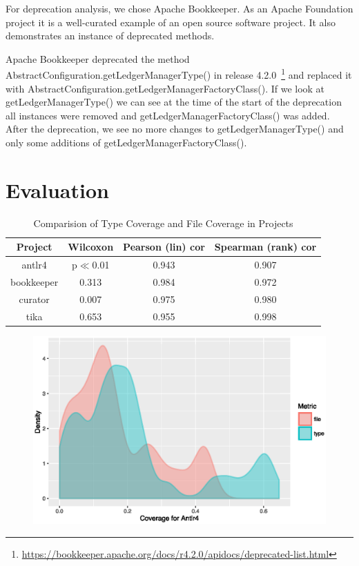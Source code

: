 \documentclass[conference]{IEEEtran}
\begin{document}
For deprecation analysis, we chose Apache Bookkeeper. As an Apache Foundation project it is a well-curated example of an open source software project. It also demonstrates an instance of deprecated methods. 

Apache Bookkeeper deprecated the method AbstractConfiguration.getLedgerManagerType() in release 4.2.0~\footnote{\url{https://bookkeeper.apache.org/docs/r4.2.0/apidocs/deprecated-list.html}} and replaced it with AbstractConfiguration.getLedgerManagerFactoryClass(). If we look at getLedgerManagerType() we can see at the time of the start of the deprecation all instances were removed and getLedgerManagerFactoryClass() was added. After the deprecation, we see no more changes to getLedgerManagerType() and only some additions of getLedgerManagerFactoryClass().

\section{Evaluation}

\begin{table}[!t]
\renewcommand{\arraystretch}{1.3}
\caption{Comparision of Type Coverage and File Coverage in Projects}
\label{tab:summary}
\centering
\begin{tabular}{c|ccc}
\hline
\bfseries Project & \bfseries Wilcoxon & \bfseries Pearson (lin) cor & \bfseries Spearman (rank) cor \\
\hline
antlr4 & p$\ll$0.01 & 0.943 & 0.907\\
bookkeeper & 0.313 & 0.984 & 0.972\\
curator & 0.007 & 0.975 & 0.980\\
tika & 0.653 & 0.955 & 0.998\\
\hline
\end{tabular}
\end{table}

\begin{figure}[!h]
\centering
\includegraphics[width=\columnwidth]{antlr-density}
\caption{}
\end{figure}
\end{document}
